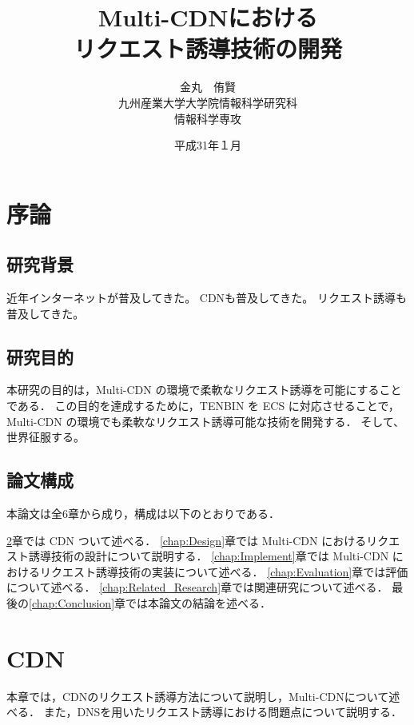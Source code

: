 \documentclass[a4j,12pt,onecolumn,oneside,titlepage,openany,final]{jreport}
\title{
 \Huge{Multi-CDNにおける}\\
 \Huge{リクエスト誘導技術の開発}
 \vspace{5.5cm}\\
}
\author{\LARGE{金丸　侑賢}\vspace{2cm}\\
\LARGE{九州産業大学大学院情報科学研究科}\vspace{0.5cm}\\
\LARGE{情報科学専攻}\vspace{1cm}\\
}
\date{\LARGE{平成31年１月}}
\begin{document}
\maketitle
\tableofcontents
\listoffigures
\listoftables

\chapter{序論}\label{chap:Prologue}

\section{研究背景}
近年インターネットが普及してきた。
CDNも普及してきた。
リクエスト誘導も普及してきた。
 
\section{研究目的}
本研究の目的は，Multi-CDN の環境で柔軟なリクエスト誘導を可能にすることである．
この目的を達成するために，TENBIN を ECS に対応させることで，Multi-CDN の環境でも柔軟なリクエスト誘導可能な技術を開発する．
そして、世界征服する。

\section{論文構成}
 本論文は全6章から成り，構成は以下のとおりである．
   
 \ref{chap:CDN}章では CDN ついて述べる．
 \ref{chap:Design}章では Multi-CDN におけるリクエスト誘導技術の設計について説明する．
 \ref{chap:Implement}章では Multi-CDN におけるリクエスト誘導技術の実装について述べる．
 \ref{chap:Evaluation}章では評価について述べる．
 \ref{chap:Related_Research}章では関連研究について述べる．
 最後の\ref{chap:Conclusion}章では本論文の結論を述べる．


\chapter{CDN}\label{chap:CDN}
本章では，CDNのリクエスト誘導方法について説明し，Multi-CDNについて述べる．
また，DNSを用いたリクエスト誘導における問題点について説明する．
\end{document}
